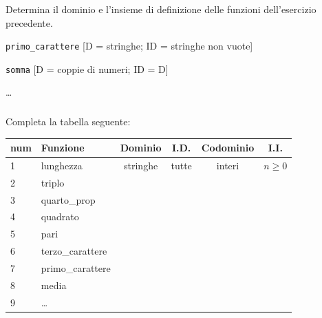 \subsubsection*{}

\begin{esercizio}\label{ese:03.1}
Determina il dominio e l'insieme di definizione delle 
funzioni dell'esercizio precedente.
 \begin{enumeratea}
\item \texttt{primo\_carattere} 
      \hfill [D = stringhe; ID = stringhe non vuote]
\item \texttt{somma} \hfill [D = coppie di numeri; ID = D]
\item \dots
 \end{enumeratea}
\end{esercizio}

\newpage %
\subsubsection*{}

\begin{esercizio}\label{ese:03.1}
Completa la tabella seguente:
\begin{center}
\begin{tabular}{llcccc}
num & Funzione & Dominio & I.D. & Codominio & I.I.\\\hline
1 & lunghezza & stringhe & tutte & interi & \(n \geqslant 0\)\\
2 & triplo &  &  &  & \\
3 & quarto\_prop &  &  &  & \\
4 & quadrato &  &  &  & \\
5 & pari &  &  &  & \\
6 & terzo\_carattere &  &  &  & \\
7 & primo\_carattere &  &  &  & \\
8 & media &  &  &  & \\
9 & \dots &  &  &  &  
\end{tabular}
\end{center}
\end{esercizio}


